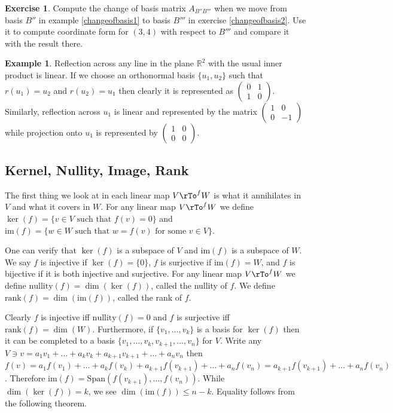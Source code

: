 \documentclass[12pt]{amsart}
\theoremstyle{definition}
\newtheorem{example}[theorem]{Example}
\newtheorem{exercise}[theorem]{Exercise}
\begin{document}
\begin{exercise}\label{} Compute the change of basis matrix $A_{B''B'''}$ when we move from basis $B''$ in example \ref{changeofbasis1} to basis $B'''$ in exercise \ref{changeofbasis2}. Use it to compute coordinate form for $(3,4)$ with respect to $B'''$ and compare it with the result there.
\end{exercise}

\begin{example}\label{reflection} Reflection across any line in the plane $\mathbb{R}^2$ with the usual inner product is linear. If we choose an orthonormal basis $\{u_1, u_2\}$ such that $r(u_1) = u_2$ and $r(u_2) = u_1$ then clearly it is represented as $\left( \begin{array}{cc} 0 & 1\\ 1 & 0 \end{array} \right)$. Similarly, reflection across $u_1$ is linear and represented by the matrix $\left( \begin{array}{cc} 1 & 0 \\ 0 & -1 \end{array} \right)$ while projection onto $u_1$ is represented by $\left( \begin{array}{cc} 1 & 0 \\ 0 & 0 \end{array} \right)$.
\end{example}

\subsection{Kernel, Nullity, Image, Rank} The first thing we look at in each linear map $V \rTo^f W$ is what it annihilates in $V$ and what it covers in $W$.
\dfn For any linear map $V \rTo^f W$ we define $\ker(f) = \{v \in V \text{ such that } f(v) = 0\}$ and $\text{im}(f) = \{w \in W \text{ such that } w = f(v) \text{ for some } v \in V\}$.

One can verify that $\ker(f)$ is a subspace of $V$ and $\text{im}(f)$ is a subspace of $W$. We say $f$ is injective if $\ker(f) = \{0\}$, $f$ is surjective if $\text{im}(f) = W$, and $f$ is bijective if it is both injective and surjective.
\dfn For any linear map $V \rTo^f W$ we define $\text{nullity}(f) = \dim(\ker(f))$, called the nullity of $f$. We define $\text{rank}(f) = \dim(\text{im}(f))$, called the rank of $f$.

Clearly $f$ is injective iff $\text{nullity}(f) = 0$ and $f$ is surjective iff $\text{rank}(f) = \dim(W)$. Furthermore, if $\{v_1, \dots, v_k\}$ is a basis for $\ker(f)$ then it can be completed to a basis $\{v_1, \dots, v_k, v_{k+1}, \dots, v_n\}$ for $V$. Write any $V \owns v = a_1v_1 + \ldots + a_kv_k + a_{k+1}v_{k+1} + \ldots + a_nv_n$ then $f(v) = a_1f(v_1) + \ldots + a_kf(v_k) + a_{k+1}f(v_{k+1}) + \ldots + a_nf(v_n) = a_{k+1}f(v_{k+1}) + \ldots + a_nf(v_n)$. Therefore $\text{im}(f) = \text{Span}(f(v_{k+1}), \dots, f(v_n))$. While $\dim(\ker(f)) = k$, we see $\dim(\text{im}(f)) \leq n-k$. Equality follows from the following theorem.
\end{document}
